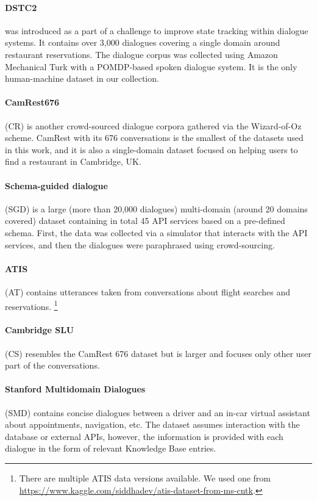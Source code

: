 \paragraph{DSTC2} \cite{henderson_robust_2014} was introduced as a part of a challenge to improve state tracking within dialogue systems. It contains over 3,000 dialogues covering a single domain around restaurant reservations. The dialogue corpus was collected using Amazon Mechanical Turk with a POMDP-based spoken dialogue system. It is the only human-machine dataset in our collection.

\paragraph{CamRest676} (CR) \cite{wen2016network} is another crowd-sourced dialogue corpora gathered via the Wizard-of-Oz scheme. CamRest with its 676 conversations is the smallest of the datasets used in this work, and it is also a single-domain dataset focused on helping users to find a restaurant in Cambridge, UK. 

\paragraph{Schema-guided dialogue} (SGD) is a large (more than 20,000 dialogues) multi-domain (around 20 domains covered) dataset containing in total 45 API services based on a pre-defined schema. First, the data was collected via a simulator that interacts with the API services, and then the dialogues were paraphrased using crowd-sourcing. \\

\paragraph{ATIS} (AT) \cite{hemphill_atis_1990} contains utterances taken from conversations about flight searches and reservations. \footnote{There are multiple ATIS data versions available. We used one from \url{https://www.kaggle.com/siddhadev/atis-dataset-from-ms-cntk}.}
\paragraph{Cambridge SLU} (CS) \cite{henderson2012discriminative} resembles the CamRest 676 dataset but is larger and focuses only other user part of the conversations.

\paragraph{Stanford Multidomain Dialogues} (SMD) \cite{eric-etal-2017-key} contains concise dialogues between a driver and an in-car virtual assistant about appointments, navigation, etc.
The dataset assumes interaction with the database or external APIs, however, the information is provided with each dialogue in the form of relevant Knowledge Base entries.

